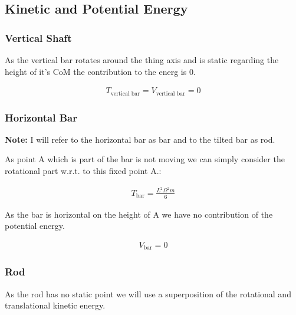 \subsection{Kinetic and Potential Energy}
\subsubsection{Vertical Shaft}
As the vertical bar rotates around the thing axis and is static regarding the height of it's CoM the contribution to the energ is 0.

\begin{equation}
    \begin{split}
        T_\text{vertical bar} = V_\text{vertical bar} = 0
    \end{split}
\end{equation}
\subsubsection{Horizontal Bar}
\textbf{Note: } I will refer to the horizontal bar as bar and to the tilted bar as rod.

As point A which is part of the bar is not moving we can simply consider the rotational part w.r.t. to this fixed point A.:

\begin{equation}
    \begin{split}
        T_\text{bar} =  \frac{L^2\Omega ^2m}{6}
    \end{split}
\end{equation}

As the bar is horizontal on the height of A we have no contribution of the potential energy.

\begin{equation}
    \begin{split}
        V_\text{bar} = 0
    \end{split}
\end{equation}

\subsubsection{Rod}
As the rod has no static point we will use a superposition of the rotational and translational kinetic energy.

